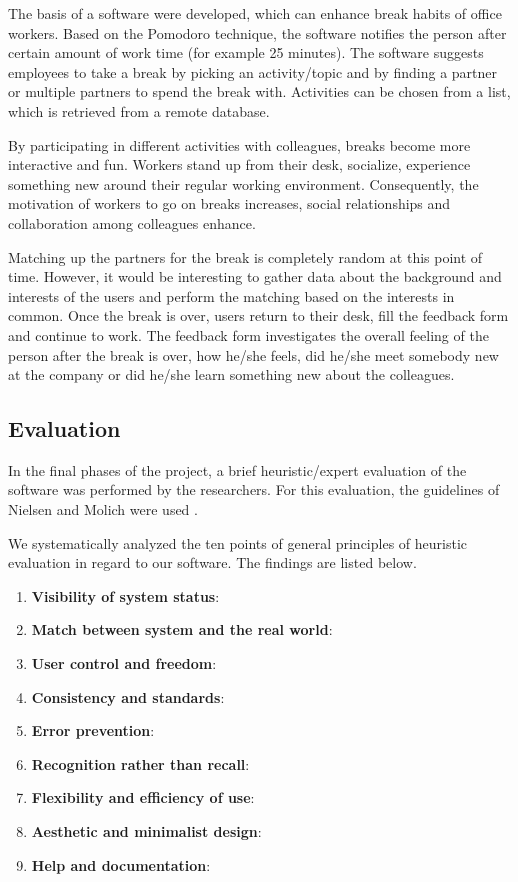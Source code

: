 The basis of a software were developed, which can enhance break habits of office workers. Based on the Pomodoro technique, the software notifies the person after certain amount of work time (for example 25 minutes). The software suggests employees to take a break by picking an activity/topic and by finding a partner or multiple partners to spend the break with. Activities can be chosen from a list, which is retrieved from a remote database. 

By participating in different activities with colleagues, breaks become more interactive and fun. Workers stand up from their desk, socialize, experience something new around their regular working environment. Consequently, the motivation of workers to go on breaks increases, social relationships and collaboration among colleagues enhance. 

Matching up the partners for the break is completely random at this point of time. However, it would be interesting to gather data about the background and interests of the users and perform the matching based on the interests in common. Once the break is over, users return to their desk, fill the feedback form and continue to work. The feedback form investigates the overall feeling of the person after the break is over, how he/she feels, did he/she meet somebody new at the company or did he/she learn something new about the colleagues. 

\subsection{Evaluation}
In the final phases of the project, a brief heuristic/expert evaluation of the software was performed by the researchers. For this evaluation, the guidelines of Nielsen and Molich were used \cite{nielsen} \cite{nielsenonline}. 

We systematically analyzed the ten points of general principles of heuristic evaluation in regard to our software. The findings are listed below. 

\begin{enumerate}
	\item \textbf{Visibility of system status}:
	\item \textbf{Match between system and the real world}:
	\item \textbf{User control and freedom}:
	\item \textbf{Consistency and standards}:
	\item \textbf{Error prevention}:
	\item \textbf{Recognition rather than recall}: 
	\item \textbf{Flexibility and efficiency of use}:
	\item \textbf{Aesthetic and minimalist design}:
	\item \textbf{Help and documentation}: 
\end{enumerate}

